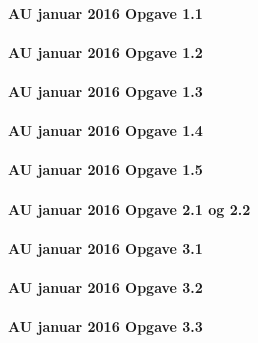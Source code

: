 \documentclass[]{book}
\let\oldparagraph\paragraph
\renewcommand{\paragraph}[1]{\oldparagraph{#1}\mbox{}}
\begin{document}
\hypertarget{au-januar-2016-opgave-1.1}{%
\paragraph{AU januar 2016 Opgave 1.1}\label{au-januar-2016-opgave-1.1}}

\hypertarget{au-januar-2016-opgave-1.2}{%
\paragraph{AU januar 2016 Opgave 1.2}\label{au-januar-2016-opgave-1.2}}

\hypertarget{au-januar-2016-opgave-1.3}{%
\paragraph{AU januar 2016 Opgave 1.3}\label{au-januar-2016-opgave-1.3}}

\hypertarget{au-januar-2016-opgave-1.4}{%
\paragraph{AU januar 2016 Opgave 1.4}\label{au-januar-2016-opgave-1.4}}

\hypertarget{au-januar-2016-opgave-1.5}{%
\paragraph{AU januar 2016 Opgave 1.5}\label{au-januar-2016-opgave-1.5}}

\hypertarget{au-januar-2016-opgave-2.1-og-2.2}{%
\paragraph{AU januar 2016 Opgave 2.1 og 2.2}\label{au-januar-2016-opgave-2.1-og-2.2}}

\hypertarget{au-januar-2016-opgave-3.1}{%
\paragraph{AU januar 2016 Opgave 3.1}\label{au-januar-2016-opgave-3.1}}

\hypertarget{au-januar-2016-opgave-3.2}{%
\paragraph{AU januar 2016 Opgave 3.2}\label{au-januar-2016-opgave-3.2}}

\hypertarget{au-januar-2016-opgave-3.3}{%
\paragraph{AU januar 2016 Opgave 3.3}\label{au-januar-2016-opgave-3.3}}
\end{document}
